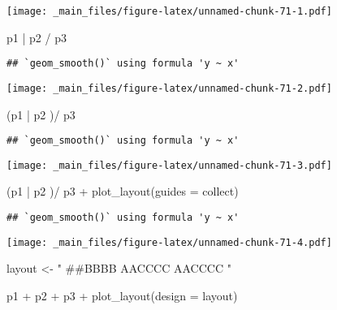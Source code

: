 \documentclass[
]{book}
\newenvironment{Shaded}{\begin{snugshade}}{\end{snugshade}}
\newcommand{\AttributeTok}[1]{\textcolor[rgb]{0.77,0.63,0.00}{#1}}
\newcommand{\FunctionTok}[1]{\textcolor[rgb]{0.00,0.00,0.00}{#1}}
\newcommand{\NormalTok}[1]{#1}
\newcommand{\OtherTok}[1]{\textcolor[rgb]{0.56,0.35,0.01}{#1}}
\newcommand{\SpecialCharTok}[1]{\textcolor[rgb]{0.00,0.00,0.00}{#1}}
\newcommand{\StringTok}[1]{\textcolor[rgb]{0.31,0.60,0.02}{#1}}
\begin{document}
\texttt{[image: \_main\_files/figure-latex/unnamed-chunk-71-1.pdf]}

\begin{Shaded}
\begin{Highlighting}[]
\NormalTok{p1 }\SpecialCharTok{|}\NormalTok{ p2 }\SpecialCharTok{/}\NormalTok{ p3}
\end{Highlighting}
\end{Shaded}

\begin{verbatim}
## `geom_smooth()` using formula 'y ~ x'
\end{verbatim}

\texttt{[image: \_main\_files/figure-latex/unnamed-chunk-71-2.pdf]}

\begin{Shaded}
\begin{Highlighting}[]
\NormalTok{(p1 }\SpecialCharTok{|}\NormalTok{ p2 )}\SpecialCharTok{/}\NormalTok{ p3}
\end{Highlighting}
\end{Shaded}

\begin{verbatim}
## `geom_smooth()` using formula 'y ~ x'
\end{verbatim}

\texttt{[image: \_main\_files/figure-latex/unnamed-chunk-71-3.pdf]}

\begin{Shaded}
\begin{Highlighting}[]
\NormalTok{(p1 }\SpecialCharTok{|}\NormalTok{ p2 )}\SpecialCharTok{/}\NormalTok{ p3 }\SpecialCharTok{+} \FunctionTok{plot\_layout}\NormalTok{(}\AttributeTok{guides =} \StringTok{\textquotesingle{}collect\textquotesingle{}}\NormalTok{)}
\end{Highlighting}
\end{Shaded}

\begin{verbatim}
## `geom_smooth()` using formula 'y ~ x'
\end{verbatim}

\texttt{[image: \_main\_files/figure-latex/unnamed-chunk-71-4.pdf]}

\begin{Shaded}
\begin{Highlighting}[]
\NormalTok{layout }\OtherTok{\textless{}{-}} \StringTok{"}
\StringTok{\#\#BBBB}
\StringTok{AACCCC}
\StringTok{AACCCC}
\StringTok{"}

\NormalTok{p1 }\SpecialCharTok{+}\NormalTok{ p2 }\SpecialCharTok{+}\NormalTok{ p3 }\SpecialCharTok{+} 
  \FunctionTok{plot\_layout}\NormalTok{(}\AttributeTok{design =}\NormalTok{ layout)}
\end{Highlighting}
\end{Shaded}
\end{document}
